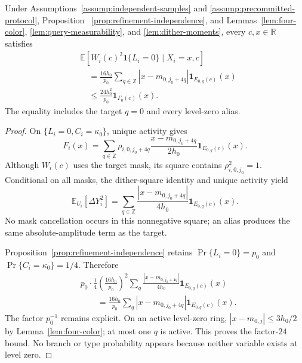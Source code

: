\begin{lemma}
\label{lem:level-zero-square}
Under Assumptions~\ref{assump:independent-samples} and
\ref{assump:precommitted-protocol}, Proposition~
\ref{prop:refinement-independence}, and Lemmas~\ref{lem:four-color},
\ref{lem:query-measurability}, and \ref{lem:dither-moments}, every
$c,x\in\mathbb R$ satisfies
\[
\begin{aligned}
 &\mathbb E[W_i(c)^2\mathbf1\{L_i=0\}\mid X_i=x,c]\\
 &\quad=\frac{16h_0}{p_0}\sum_{q\in\mathbb Z}
 |x-m_{0,j_0+4q}|\mathbf1_{E_{0,q}(c)}(x)\\
 &\quad\leq\frac{24h_0^2}{p_0}\mathbf1_{\Gamma_0(c)}(x).
\end{aligned}
\]
The equality includes the target $q=0$ and every level-zero alias.
\end{lemma}

\begin{proof}
On $\{L_i=0,C_i=\kappa_0\}$, unique activity gives
\[
 F_i(x)=\sum_{q\in\mathbb Z}\rho_{i,0,j_0+4q}
 \frac{x-m_{0,j_0+4q}}{2h_0}\mathbf1_{E_{0,q}(c)}(x).
\]
Although $W_i(c)$ uses the target mask, its square contains
$\rho_{i,0,j_0}^2=1$.  Conditional on all masks, the dither-square identity
and unique activity yield
\[
 \mathbb E_{U_i}[\Delta Y_i^2]
 =\sum_{q\in\mathbb Z}
 \frac{|x-m_{0,j_0+4q}|}{4h_0}\mathbf1_{E_{0,q}(c)}(x).
\]
No mask cancellation occurs in this nonnegative square; an alias produces
the same absolute-amplitude term as the target.

Proposition~\ref{prop:refinement-independence} retains
$\Pr\{L_i=0\}=p_0$ and $\Pr\{C_i=\kappa_0\}=1/4$.  Therefore
\[
\begin{aligned}
 &p_0\cdot\frac14\left(\frac{16h_0}{p_0}\right)^2
 \sum_q\frac{|x-m_{0,j_0+4q}|}{4h_0}
  \mathbf1_{E_{0,q}(c)}(x)\\
 &\qquad=\frac{16h_0}{p_0}\sum_q|x-m_{0,j_0+4q}|
  \mathbf1_{E_{0,q}(c)}(x).
\end{aligned}
\]
The factor $p_0^{-1}$ remains explicit.  On an active level-zero ring,
$|x-m_{0,j}|\leq3h_0/2$ by Lemma~\ref{lem:four-color}; at most one $q$
is active.  This proves the factor-$24$ bound.  No branch or type probability
appears because neither variable exists at level zero.
\end{proof}

